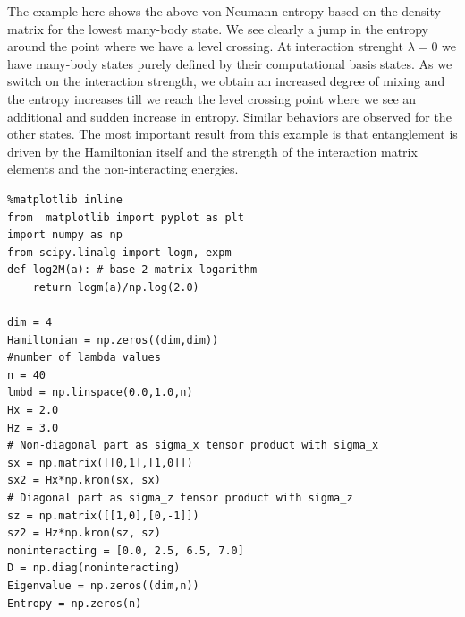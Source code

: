 \documentclass{beamer}
\begin{document}
\begin{frame}
The example here shows the above von Neumann entropy based on the
density matrix for the lowest many-body state. We see clearly a jump
in the entropy around the point where we have a level crossing. At
interaction strenght $\lambda=0$ we have many-body states purely
defined by their computational basis states. As we switch on the
interaction strength, we obtain an increased degree of mixing and the
entropy increases till we reach the level crossing point where we see
an additional and sudden increase in entropy. Similar behaviors are
observed for the other states. The most important result from this
example is that entanglement is driven by the Hamiltonian itself and
the strength of the interaction matrix elements and the
non-interacting energies.
































































\begin{verbatim}
%matplotlib inline
from  matplotlib import pyplot as plt
import numpy as np
from scipy.linalg import logm, expm
def log2M(a): # base 2 matrix logarithm
    return logm(a)/np.log(2.0)

dim = 4
Hamiltonian = np.zeros((dim,dim))
#number of lambda values
n = 40
lmbd = np.linspace(0.0,1.0,n)
Hx = 2.0
Hz = 3.0
# Non-diagonal part as sigma_x tensor product with sigma_x
sx = np.matrix([[0,1],[1,0]])
sx2 = Hx*np.kron(sx, sx)
# Diagonal part as sigma_z tensor product with sigma_z
sz = np.matrix([[1,0],[0,-1]])
sz2 = Hz*np.kron(sz, sz)
noninteracting = [0.0, 2.5, 6.5, 7.0]
D = np.diag(noninteracting)
Eigenvalue = np.zeros((dim,n))
Entropy = np.zeros(n)


\end{verbatim}
\end{frame}
\end{document}
